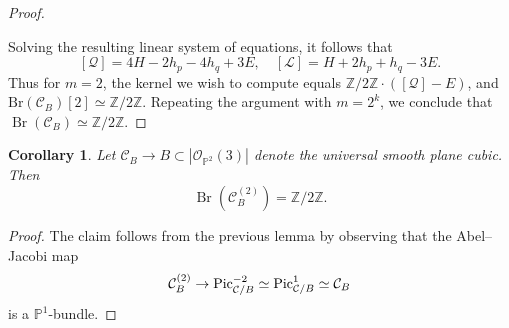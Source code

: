 \documentclass[11pt]{amsart}
\theoremstyle{plain}
\newtheorem{cor}[thm]{Corollary}
\theoremstyle{definition}
\theoremstyle{remark}
\DeclareMathOperator{\Br}{Br}
\newcommand{\Pic}{\mathop{\rm Pic}\nolimits}
\begin{document}
\begin{proof}
\begin{enumerate}
\end{enumerate}
Solving the resulting linear system of equations, it follows that 
\[
[\mathcal{Q}] = 4 H -2 h_p - 4 h_q +3 E, \quad [\mathcal{L}] = H + 2 h_p + h_q - 3E.
\]
Thus for $m=2$, the kernel we wish to compute equals $\mathbb Z/2\mathbb Z\cdot([\mathcal{Q}]-E)$, and $\mathrm{Br}(\mathcal{C}_B)[2]\simeq \mathbb Z/2\mathbb Z$. Repeating the argument with $m = 2^k$, we conclude that $\Br(\mathcal C_B) \simeq \mathbb Z/2\mathbb Z$.
\end{proof}

\begin{cor}
    Let $\mathcal C_B \to B \subset |\mathcal O_{\mathbb P^2}(3)|$ denote the universal smooth plane cubic. Then
    $$\Br(\mathcal C_B^{(2)}) = \mathbb Z/2\mathbb Z.$$
\end{cor}
\begin{proof}
    The claim follows from the previous lemma by observing that the Abel--Jacobi map
    \begin{align*}
    \mathcal C^{(2)}_B \to \Pic^{-2}_{\mathcal C / B} \simeq \Pic^1_{\mathcal C/B} \simeq \mathcal C_B
    \end{align*}
    is a $\mathbb P^1$-bundle.
\end{proof}
\end{document}
